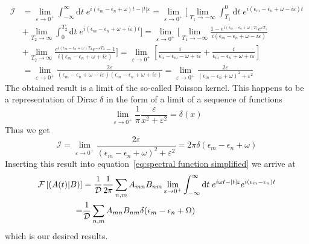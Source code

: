 \begin{align}
\mathcal{I} &= \lim _{\varepsilon \to 0^+} \int_{-\infty}^{\infty} \mathrm{d} t \; 
e^{ i (\epsilon_m-\epsilon_n+\omega)t -|t| \varepsilon} = \lim _{\varepsilon \to 0^+} 
\Bigg[\lim_{T_1\to -\infty}\int_{T_1}^{0} \mathrm{d} t \; e^{ i (\epsilon_m-\epsilon_n+\omega -i \varepsilon)t}\nonumber\\
&+\lim_{T_2\to \infty}\int_{0}^{T_2} \mathrm{d} t \;  e^{ i (\epsilon_m-\epsilon_n+\omega + i\varepsilon)t}\Bigg]
= \lim _{\varepsilon \to 0^+} \Bigg[\lim_{T_1\to -\infty} 
\frac{1-e^{ i (\epsilon_m-\epsilon_n+\omega )T_1} e^{\varepsilon T_1}}{i (\epsilon_m-\epsilon_n+\omega -i \varepsilon)}\nonumber\\
 &+ \lim_{T_2\to \infty} \frac{e^{ i (\epsilon_m-\epsilon_n+\omega )T_2} e^{-\varepsilon T_2}-1}
{i (\epsilon_m-\epsilon_n+\omega +i \varepsilon)}\Bigg]
= \lim _{\varepsilon \to 0^+} \left[\frac{i}{\epsilon_n-\epsilon_m-\omega +i \varepsilon} + 
\frac{i}{\epsilon_m-\epsilon_n+\omega +i \varepsilon} \right]\nonumber\\
 &= \lim _{\varepsilon \to 0^+}
\frac{2\varepsilon}{(\epsilon_m-\epsilon_n+\omega -i \varepsilon)(\epsilon_m-\epsilon_n+\omega +i \varepsilon)}
=\lim _{\varepsilon \to 0^+} \frac{2\varepsilon}{(\epsilon_m-\epsilon_n+\omega)^2 +\varepsilon^2}
\end{align}
The obtained result is a limit of the so-called Poisson kernel. This happens to be
a representation of Dirac \(\delta\) in the form of a limit of a sequence of functions~\autocite{byron1992mathematics}
\begin{equation}
\lim _{\varepsilon \to 0^+} \frac{1}{\pi} \frac{\varepsilon}{x^2 +\varepsilon^2} = \delta(x) 
\end{equation}
Thus we get
\begin{equation}
\mathcal{I} = \lim _{\varepsilon \to 0^+} \frac{2\varepsilon}{(\epsilon_m-\epsilon_n+\omega)^2 +\varepsilon^2}
= 2\pi \delta(\epsilon_m-\epsilon_n+\omega)
\end{equation}
Inserting this result into equation~\eqref{eq:spectral function simplified} we arrive at
\begin{align}
\mathcal{F}\left[\left(A(t) \middle| B\right)\right] &= \frac{1}{\mathcal{D}} \frac{1}{2 \pi}\sum_{n,m} A_{mn} B_{nm}  
\lim _{\varepsilon \to 0^+} \int_{-\infty}^{\infty} \mathrm{d} t \; e^{i \omega t-|t| 
\varepsilon}e^{i (\epsilon_m-\epsilon_n) t} \nonumber\\
=& \frac{1}{\mathcal{D}}\sum_{n,m} A_{mn} B_{nm} \delta(\epsilon_m-\epsilon_n+\Omega)
\end{align}
which is our desired results.